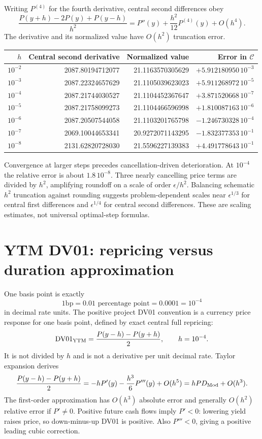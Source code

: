 \documentclass[12pt,a4paper]{article}
\newcommand{\bp}{\mathrm{bp}}
\begin{document}
Writing $P^{(4)}$ for the fourth derivative, central second differences obey
\begin{equation}
 \frac{P(y+h)-2P(y)+P(y-h)}{h^2}
 =P''(y)+\frac{h^2}{12}P^{(4)}(y)+O(h^4).
\end{equation}
The derivative and its normalized value have $O(h^2)$ truncation error.
\begin{center}\small
\begin{tabular}{@{}rrrr@{}}
\toprule
$h$ & Central second derivative & Normalized value & Error in $\mathcal C$\\
\midrule
$10^{-2}$ & 2087.80194712077 & 21.1163570305629 & $+5.912180950\,10^{-3}$\\
$10^{-3}$ & 2087.22324657629 & 21.1105039623023 & $+5.911268972\,10^{-5}$\\
$10^{-4}$ & 2087.21744030527 & 21.1104452367647 & $+3.871520668\,10^{-7}$\\
$10^{-5}$ & 2087.21758099273 & 21.1104466596998 & $+1.810087163\,10^{-6}$\\
$10^{-6}$ & 2087.20507544058 & 21.1103201765798 & $-1.246730328\,10^{-4}$\\
$10^{-7}$ & 2069.10044653341 & 20.9272071143295 & $-1.832377353\,10^{-1}$\\
$10^{-8}$ & 2131.62820728030 & 21.5596227139383 & $+4.491778643\,10^{-1}$\\
\bottomrule
\end{tabular}
\end{center}
Convergence at larger steps precedes cancellation-driven deterioration.
At $10^{-4}$ the relative error is about $1.8\,10^{-8}$.
Three nearly cancelling price terms are divided by $h^2$, amplifying
roundoff on a scale of order $\epsilon/h^2$.
Balancing schematic $h^2$ truncation against rounding suggests
problem-dependent scales near $\epsilon^{1/3}$ for central first differences
and $\epsilon^{1/4}$ for central second differences. These are scaling
estimates, not universal optimal-step formulas.

\section{YTM DV01: repricing versus duration approximation}
One basis point is exactly
\[
 1\bp=0.01\text{ percentage point}=0.0001=10^{-4}
\]
in decimal rate units. The positive project DV01 convention is a currency
price response for one basis point, defined by exact central full repricing:
\begin{equation}
 {\rm DV01}_{\rm YTM}=\frac{P(y-h)-P(y+h)}2,\qquad h=10^{-4}.
\end{equation}
It is not divided by $h$ and is not a derivative per unit decimal rate.
Taylor expansion derives
\begin{equation}
 \frac{P(y-h)-P(y+h)}2
 =-hP'(y)-\frac{h^3}{6}P'''(y)+O(h^5)
 =hPD_{\rm Mod}+O(h^3).
\end{equation}
The first-order approximation has $O(h^3)$ absolute error and generally
$O(h^2)$ relative error if $P'\ne0$. Positive future cash flows imply
$P'<0$: lowering yield raises price, so down-minus-up DV01 is positive.
Also $P'''<0$, giving a positive leading cubic correction.
\end{document}
